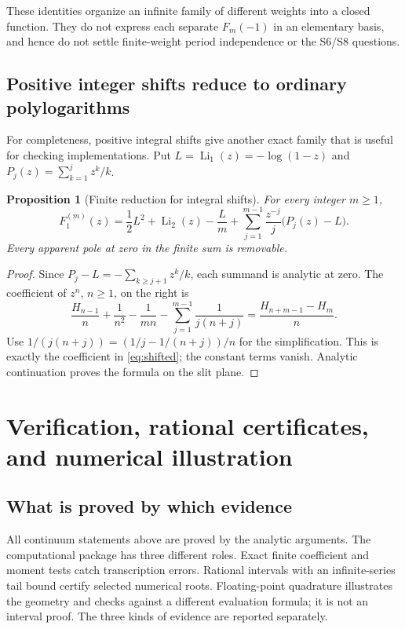 \documentclass[11pt]{article}
\numberwithin{equation}{section}
\newtheorem{proposition}[theorem]{Proposition}
\theoremstyle{definition}
\theoremstyle{remark}
\DeclareMathOperator{\Li}{Li}
\begin{document}
These identities organize an infinite family of different weights into
a closed function. They do not express each separate $F_m(-1)$ in
an elementary basis, and hence do not settle finite-weight period
independence or the S6/S8 questions.

\subsection{Positive integer shifts reduce to ordinary polylogarithms}
For completeness, positive integral shifts give another exact family
that is useful for checking implementations. Put $L=\Li_1(z)=-\log(1-z)$
and $P_j(z)=\sum_{k=1}^jz^k/k$.

\begin{proposition}[Finite reduction for integral shifts]\label{prop:integer-shift}
For every integer $m\ge1$,
\begin{equation}\label{eq:integer-shift}
 F_1^{(m)}(z)=\frac12L^2+\Li_2(z)-\frac Lm
       +\sum_{j=1}^{m-1}\frac{z^{-j}}j\bigl(P_j(z)-L\bigr).
\end{equation}
Every apparent pole at zero in the finite sum is removable.
\end{proposition}
\begin{proof}
Since $P_j-L=-\sum_{k\ge j+1}z^k/k$, each summand is analytic at
zero. The coefficient of $z^n$, $n\ge1$, on the right is
\[
 \frac{H_{n-1}}n+\frac1{n^2}-\frac1{mn}
                   -\sum_{j=1}^{m-1}\frac1{j(n+j)}
 =\frac{H_{n+m-1}-H_m}{n}.
\]
Use $1/(j(n+j))=(1/j-1/(n+j))/n$ for the simplification.
This is exactly the coefficient in \eqref{eq:shifted}; the constant
terms vanish. Analytic continuation proves the formula on the slit
plane.
\end{proof}

\section{Verification, rational certificates, and numerical illustration}
\label{sec:verification}
\subsection{What is proved by which evidence}
All continuum statements above are proved by the analytic arguments.
The computational package has three different roles. Exact finite
coefficient and moment tests catch transcription errors. Rational
intervals with an infinite-series tail bound certify selected numerical
roots. Floating-point quadrature illustrates the geometry and checks
against a different evaluation formula; it is not an interval proof.
The three kinds of evidence are reported separately.
\end{document}
